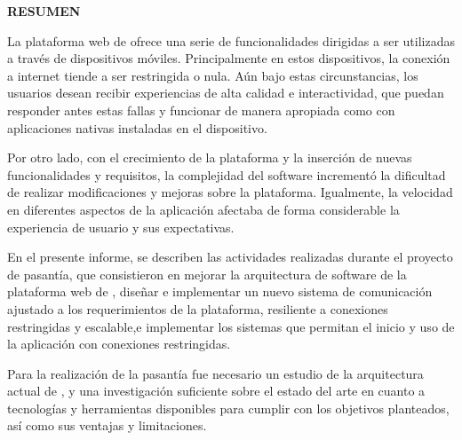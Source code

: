 
\setcounter{page}{4}
\begin{center}
\textsc{\bfseries\uppercase{Resumen}}
\end{center}

La plataforma web de \business ofrece una serie de funcionalidades dirigidas a ser utilizadas a través de dispositivos móviles. Principalmente en estos dispositivos, la conexión a internet tiende a ser restringida o nula. Aún bajo estas circunstancias, los usuarios desean recibir experiencias de alta calidad e interactividad, que puedan responder antes estas fallas y funcionar de manera apropiada como con aplicaciones nativas instaladas en el dispositivo.

Por otro lado, con el crecimiento de la plataforma y la inserción de nuevas funcionalidades y requisitos, la complejidad del software incrementó la dificultad de realizar modificaciones y mejoras sobre la plataforma. Igualmente, la velocidad en diferentes aspectos de la aplicación afectaba de forma considerable la experiencia de usuario y sus expectativas.

En el presente informe, se describen las actividades realizadas durante el proyecto de pasantía, que consistieron en mejorar la arquitectura de software de la plataforma web de \business, diseñar e implementar un nuevo sistema de comunicación ajustado a los requerimientos de la plataforma, resiliente a conexiones restringidas y escalable,e implementar los sistemas que permitan el inicio y uso de la aplicación con conexiones restringidas.

Para la realización de la pasantía fue necesario un estudio de la arquitectura actual de \business, y una investigación suficiente sobre el estado del arte en cuanto a tecnologías y herramientas disponibles para cumplir con los objetivos planteados, así como sus ventajas y limitaciones.

\newpage

